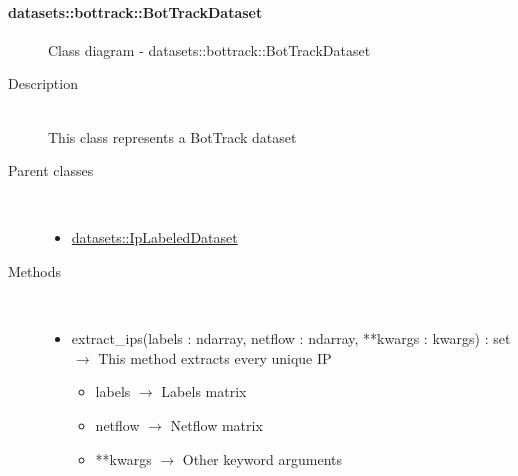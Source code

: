\hypertarget{datasets::bottrack::BotTrackDataset}{}
\paragraph[BotTrackDataset]{datasets::bottrack::BotTrackDataset}
 \hfill\begin{figure}[h]
\centering
{}
\caption{Class diagram - datasets::bottrack::BotTrackDataset}
\end{figure}\begin{description}
\item[Description] \hfill \\
 This class represents a BotTrack dataset
\item[Parent classes] \hfill \\
 \vspace{-1cm}
\begin{itemize}
\item \hyperlink{datasets::IpLabeledDataset}{datasets::IpLabeledDataset}
\end{itemize}

\item[Methods] \hfill \\
 \vspace{-1cm}
\begin{itemize}
\item extract\_ips(labels : ndarray, netflow : ndarray, **kwargs : kwargs) : set $\rightarrow$ This method extracts every unique IP\begin{itemize}
\item labels $\rightarrow$ Labels matrix
\item netflow $\rightarrow$ Netflow matrix
\item **kwargs $\rightarrow$ Other keyword arguments
\end{itemize}

\end{itemize}

\end{description}
\hypertarget{datasets::bottrack::BotTrackDatasetBuilder}{}
